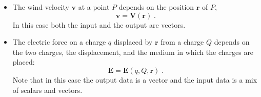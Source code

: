 \begin{frame}
\begin{itemize}
\item The wind velocity $\textbf{v}$ at a point $P$ depends on the position $\textbf{r}$ of $P$,
\[
\textbf{v} = \textbf{V} (\textbf{r})\; .
\]
In this case both the input and the output are vectors.

\item<2-> The electric force on a charge $q$ displaced by $\textbf{r}$ from a charge $Q$ depends on the two charges, the displacement, and the medium in which the charges are placed:
\[
\textbf{E} =\textbf{E}(q, Q,\textbf{r})\; .
\]
Note that in this case the output data is a vector and the input data is a mix of scalars and vectors.
\end{itemize}
\vskip 8cm
\end{frame}
